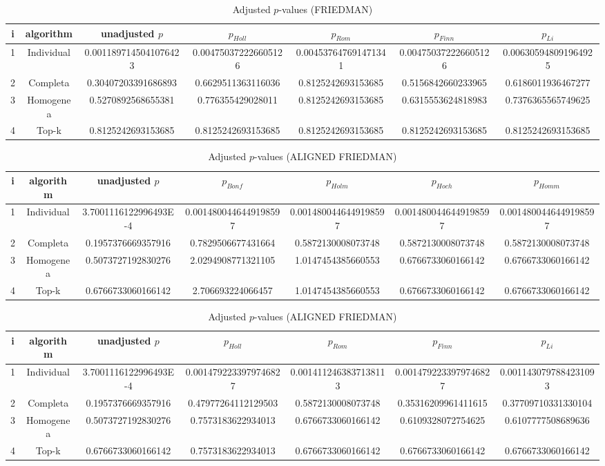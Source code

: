 \documentclass[a4paper,10pt]{article}
\begin{document}
\begin{landscape}
\begin{table}[!htp]
\centering\scriptsize
\caption{Adjusted $p$-values (FRIEDMAN)}
\begin{tabular}{ccccccc}
i&algorithm&unadjusted $p$&$p_{Holl}$&$p_{Rom}$&$p_{Finn}$&$p_{Li}$\\
\hline
1&Individual&0.0011897145041076423&0.004750372226605126&0.004537647691471341&0.004750372226605126&0.006305948091964925\\
2&Completa&0.30407203391686893&0.6629511363116036&0.8125242693153685&0.5156842660233965&0.6186011936467277\\
3&Homogenea&0.5270892568655381&0.776355429028011&0.8125242693153685&0.6315553624818983&0.7376365565749625\\
4&Top-k&0.8125242693153685&0.8125242693153685&0.8125242693153685&0.8125242693153685&0.8125242693153685\\
\hline
\end{tabular}
\end{table}


\newpage

\begin{table}[!htp]
\centering\scriptsize
\caption{Adjusted $p$-values (ALIGNED FRIEDMAN)}
\begin{tabular}{ccccccc}
i&algorithm&unadjusted $p$&$p_{Bonf}$&$p_{Holm}$&$p_{Hoch}$&$p_{Homm}$\\
\hline
1&Individual&3.7001116122996493E-4&0.0014800446449198597&0.0014800446449198597&0.0014800446449198597&0.0014800446449198597\\
2&Completa&0.1957376669357916&0.7829506677431664&0.5872130008073748&0.5872130008073748&0.5872130008073748\\
3&Homogenea&0.5073727192830276&2.0294908771321105&1.0147454385660553&0.6766733060166142&0.6766733060166142\\
4&Top-k&0.6766733060166142&2.706693224066457&1.0147454385660553&0.6766733060166142&0.6766733060166142\\
\hline
\end{tabular}
\end{table}

\begin{table}[!htp]
\centering\scriptsize
\caption{Adjusted $p$-values (ALIGNED FRIEDMAN)}
\begin{tabular}{ccccccc}
i&algorithm&unadjusted $p$&$p_{Holl}$&$p_{Rom}$&$p_{Finn}$&$p_{Li}$\\
\hline
1&Individual&3.7001116122996493E-4&0.0014792233979746827&0.0014112463837138113&0.0014792233979746827&0.0011430797884231093\\
2&Completa&0.1957376669357916&0.47977264112129503&0.5872130008073748&0.35316209961411615&0.37709710331330104\\
3&Homogenea&0.5073727192830276&0.7573183622934013&0.6766733060166142&0.6109328072754625&0.6107777508689636\\
4&Top-k&0.6766733060166142&0.7573183622934013&0.6766733060166142&0.6766733060166142&0.6766733060166142\\
\hline
\end{tabular}
\end{table}



\end{landscape}
\end{document}
